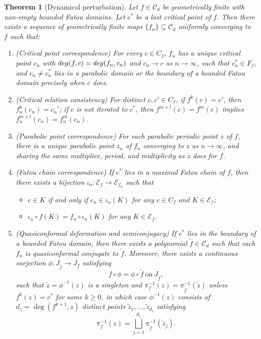 \documentclass[10pt,a4paper]{amsart}
\newtheorem{theorem}{Theorem}
\def\CCCC{\mathscr C}
\def\EEE{{\cal E}}
\def\cal{\mathcal}
\def\t{\tilde}
\begin{document}
	\begin{theorem}[Dynamical perturbation]\label{thm:perturbation}
		Let $f\in\CCCC_d$ be  geometrically finite with non-empty bounded Fatou domains. Let $c^*$ be a last critical point of $f$. Then there exists a sequence of geometrically finite maps $\{f_n\}\subseteq \CCCC_d$ uniformly converging to $f$ such that:
		\begin{enumerate}
			\item \textup{(Critical point correspondence)} For every $c\in C_f$,  $f_n$ has a unique critical point $c_n$ with  ${\rm deg}(f,c)={\rm deg}(f_n, c_n)$ and $c_n\to c$ as $n\to\infty$, such that $c_n^*\in F_f$, and  $c_n\not=c_n^*$ lies in a parabolic domain or the boundary of a bounded Fatou domain precisely when $c$ does.\vspace{3pt}
			
			\item \textup{(Critical relation consistency)} For distinct $c,c'\in C_f$, if $f^k(c)=c'$, then $f_n^k(c_n)=c_n'$;
			if $c$ is not iterated to $c^*$, then $f^{m+l}(c)=f^{m}(c)$ implies $f_n^{m+l}(c_{n})=f_n^m(c_{n})$. \vspace{3pt}
			\item\textup{(Parabolic point correspondence)} For each parabolic periodic point $z$ of $f$, there is a unique parabolic point $z_n$ of $f_n$ converging to $z$ as $n\to\infty$, and sharing the same multiplier, period, and multiplicity as $z$ does for $f$.			
			
			\item \textup{(Fatou chain correspondence)} If $c^*$ lies in a maximal Fatou chain of $f$, then there exists a bijection $\iota_n:\EEE_f\to\EEE_{f_n}$ such that\vspace{2pt}
			\begin{itemize}
				\item $c\in K$ if and only if $c_n\in\iota_n(K)$ for any $c\in C_f$ and $K\in\EEE_f$;
				\item $\iota_n\circ f(K)=f_n\circ \iota_n(K)$ for any $K\in\EEE_f$.
			\end{itemize}
			\vspace{3pt}
			
			\item \textup{(Quasiconformal deformation and semiconjugacy)} If $c^*$ lies in the boundary of  a bounded Fatou domain, then there exists a polynomial $\t{f}\in\CCCC_d$ such that each $f_n$ is  quasiconformal conjugate to $\t{f}$. Moreover, there exists a continuous surjection $\phi:J_{\t{f}}\to J_f$ satisfying $$f\circ\phi=\phi\circ \t{f}\ \text{on}\ J_{\t{f}},$$ such that   $\t{z}=\phi^{-1}(z)$ is a singleton and $\pi_f^{-1}(z)=\pi_{\t{f}}^{-1}(\t{z})$ unless $f^k(z) = c^*$ for some $k \ge 0$, in which case $\phi^{-1}(z)$ consists of $d_z=\deg(f^{k+1}, z)$ distinct points $\t{z}_1,\ldots,\t{z}_{d_z}$ satisfying $$\pi_f^{-1}(z)=\bigsqcup_{j=1}^{d_z}\pi_{\t{f}}^{-1}(\t{z}_j).$$
					\end{enumerate}
	\end{theorem}
\end{document}
